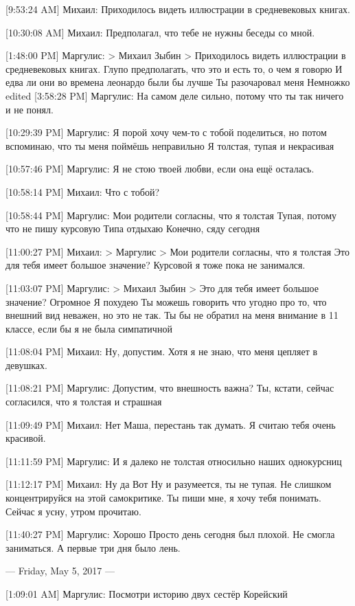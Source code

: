 \documentclass{article}
\begin{document}
[9:53:24 AM] Михаил:
Приходилось видеть иллюстрации в средневековых книгах.

[10:30:08 AM] Михаил:
Предполагал, что тебе не нужны беседы со мной.

[1:48:00 PM] Маргулис:
> Михаил Зыбин
> Приходилось видеть иллюстрации в средневековых книгах.
Глупо предполагать, что это и есть то, о чем я говорю
 И едва ли они во времена леонардо были бы лучше
 Ты разочаровал меня
 Немножко
edited 
[3:58:28 PM] Маргулис:
На самом деле сильно, потому что ты так ничего и не понял.

[10:29:39 PM] Маргулис:
Я порой хочу чем-то с тобой поделиться, но потом вспоминаю, что ты меня поймёшь неправильно
 Я толстая, тупая и некрасивая

[10:57:46 PM] Маргулис:
Я не стою твоей любви, если она ещё осталась.

[10:58:14 PM] Михаил:
Что с тобой?

[10:58:44 PM] Маргулис:
Мои родители согласны, что я толстая
 Тупая, потому что не пишу курсовую
 Типа отдыхаю
 Конечно, сяду сегодня

[11:00:27 PM] Михаил:
> Маргулис
> Мои родители согласны, что я толстая
Это для тебя имеет большое значение?
 Курсовой я тоже пока не занимался.

[11:03:07 PM] Маргулис:
> Михаил Зыбин
> Это для тебя имеет большое значение?
Огромное
 Я похудею
 Ты можешь говорить что угодно про то, что внешний вид неважен,  но это не так. Ты бы не обратил на меня внимание в 11 классе, если бы я не была симпатичной

[11:08:04 PM] Михаил:
Ну, допустим. Хотя я не знаю, что меня цепляет в девушках.

[11:08:21 PM] Маргулис:
Допустим, что внешность важна?
 Ты, кстати, сейчас согласился, что я толстая и страшная

[11:09:49 PM] Михаил:
Нет
 Маша, перестань так думать.
 Я считаю тебя очень красивой.

[11:11:59 PM] Маргулис:
И я далеко не толстая относильно наших однокурсниц

[11:12:17 PM] Михаил:
Ну да
 Вот
 Ну и разумеется, ты не тупая.
 Не слишком концентрируйся на этой самокритике.
 Ты пиши мне, я хочу тебя понимать. Сейчас я усну, утром прочитаю.

[11:40:27 PM] Маргулис:
Хорошо
 Просто день сегодня был плохой. Не смогла заниматься. А первые три дня было лень.

--- Friday, May 5, 2017 ---

[1:09:01 AM] Маргулис:
Посмотри историю двух сестёр
 Корейский
\end{document}
